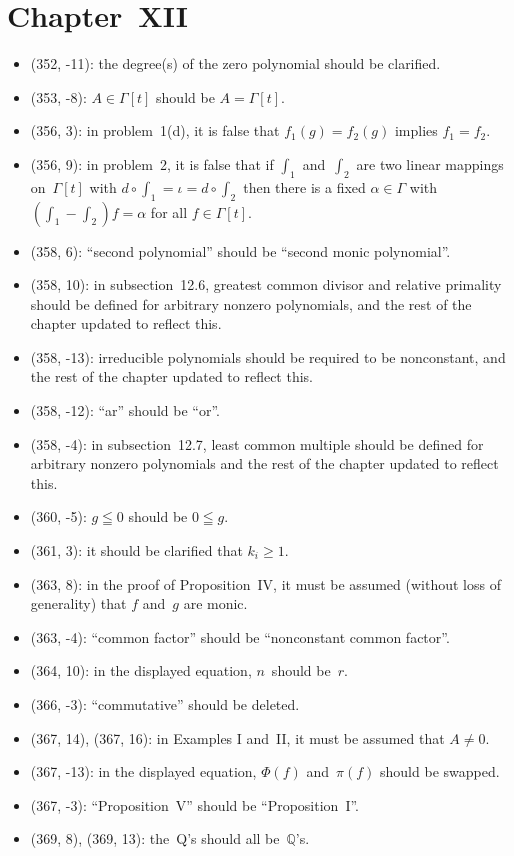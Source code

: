 \documentclass[letterpaper,12pt]{article}
\newcommand{\Q}{\mathbb{Q}}
\newcommand{\after}{\circ}
\begin{document}
\section*{Chapter~XII}
\begin{itemize}
\item (352, -11): the degree(s) of the zero polynomial should be clarified.
\item (353, -8): \(A\in\Gamma[t]\) should be \(A=\Gamma[t]\).
\item (356, 3): in problem~1(d), it is false that \(f_1(g)=f_2(g)\) implies \(f_1=f_2\).
\item (356, 9): in problem~2, it is false that if \(\int_1\) and~\(\int_2\) are two linear mappings on~\(\Gamma[t]\) with \(d\after\int_1=\iota=d\after\int_2\) then there is a fixed \(\alpha\in\Gamma\) with \((\int_1-\int_2)f=\alpha\) for all \(f\in\Gamma[t]\).
\item (358, 6): ``second polynomial'' should be ``second monic polynomial''.
\item (358, 10): in subsection~12.6, greatest common divisor and relative primality should be defined for arbitrary nonzero polynomials, and the rest of the chapter updated to reflect this.
\item (358, -13): irreducible polynomials should be required to be nonconstant, and the rest of the chapter updated to reflect this.
\item (358, -12): ``ar'' should be ``or''.
\item (358, -4): in subsection~12.7, least common multiple should be defined for arbitrary nonzero polynomials and the rest of the chapter updated to reflect this.
\item (360, -5): \(g\leqq 0\) should be \(0\leqq g\).
\item (361, 3): it should be clarified that \(k_i\ge 1\).
\item (363, 8): in the proof of Proposition~IV, it must be assumed (without loss of generality) that \(f\) and~\(g\) are monic.
\item (363, -4): ``common factor'' should be ``nonconstant common factor''.
\item (364, 10): in the displayed equation, \(n\)~should be~\(r\).
\item (366, -3): ``commutative'' should be deleted.
\item (367, 14), (367, 16): in Examples I and~II, it must be assumed that \(A\ne 0\).
\item (367, -13): in the displayed equation, \(\Phi(f)\) and~\(\pi(f)\) should be swapped.
\item (367, -3): ``Proposition~V'' should be ``Proposition~I''.
\item (369, 8), (369, 13): the~Q's should all be~\(\Q\)'s.
\end{itemize}
\end{document}
